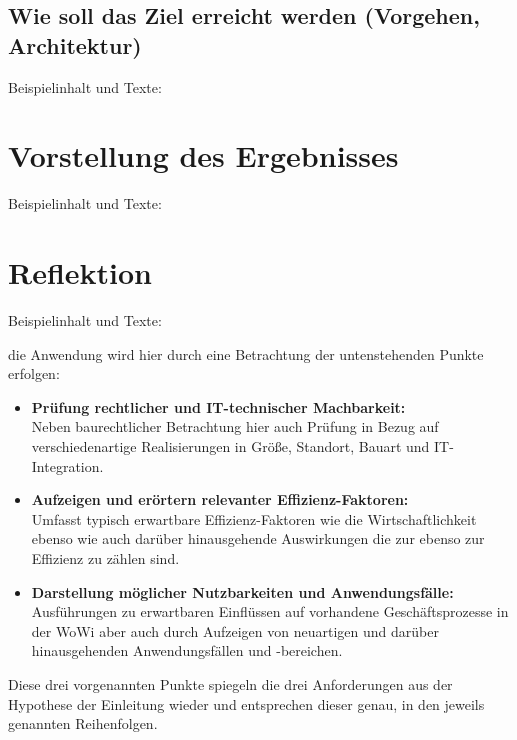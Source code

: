 \documentclass[12pt,oneside,titlepage]{scrartcl}
\begin{document}
\subsection{Wie soll das Ziel erreicht werden (Vorgehen, Architektur)}
Beispielinhalt und Texte:

\newpage
\section{Vorstellung des Ergebnisses}
Beispielinhalt und Texte:

\newpage
\section{Reflektion}
Beispielinhalt und Texte:

 die Anwendung wird hier durch eine Betrachtung  der untenstehenden Punkte erfolgen: 
\begin{itemize}
	\item \textbf{Prüfung rechtlicher und IT-technischer Machbarkeit:}
	\\ Neben baurechtlicher Betrachtung hier auch Prüfung in Bezug auf verschiedenartige Realisierungen in Größe, Standort, Bauart und IT-Integration.
	\item \textbf{Aufzeigen und erörtern relevanter Effizienz-Faktoren:}
	\\ Umfasst typisch erwartbare Effizienz-Faktoren wie die Wirtschaftlichkeit ebenso wie auch darüber hinausgehende Auswirkungen die zur ebenso zur Effizienz zu zählen sind.
	\item \textbf{Darstellung möglicher Nutzbarkeiten und Anwendungsfälle:}
	\\ Ausführungen zu erwartbaren Einflüssen auf vorhandene Geschäftsprozesse in der \ac{WoWi} aber auch durch Aufzeigen von neuartigen und darüber hinausgehenden Anwendungsfällen und -bereichen.
\end{itemize}

Diese drei vorgenannten Punkte spiegeln die drei Anforderungen aus der Hypothese der Einleitung wieder und entsprechen dieser genau, in den jeweils genannten Reihenfolgen. 
\end{document}

